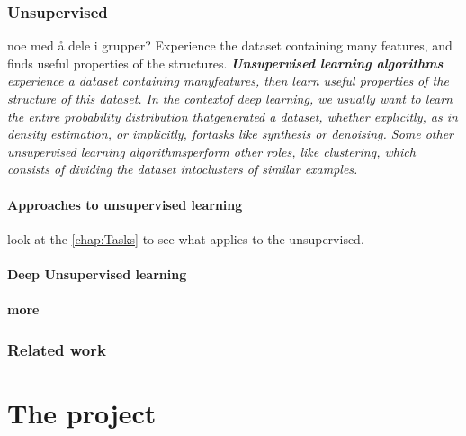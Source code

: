 \documentclass[a4paper,english]{ifimaster}
\begin{document}
\section{Unsupervised}
noe med å dele i grupper?
Experience the dataset containing many features, and finds useful properties of the structures. 
\textit{\textbf{Unsupervised learning algorithms} experience a dataset containing manyfeatures, then learn useful properties of the structure of this dataset. In the contextof deep learning, we usually want to learn the entire probability distribution thatgenerated a dataset, whether explicitly, as in density estimation, or implicitly, fortasks like synthesis or denoising. Some other unsupervised learning algorithmsperform other roles, like clustering, which consists of dividing the dataset intoclusters of similar examples.}
\cite{Goodfellow-et-al-2016}


\subsection{Approaches to unsupervised learning}
look at the \autoref{chap:Tasks} to see what applies to the unsupervised.

\subsection{Deep Unsupervised learning}
\subsection{more}
\section{Related work}


	      
		
		
		
		
		
		
		
		
		
		
		
		
		
		
		
		
		
		
		
		
		
		
		
		
		
\part{The project}
\end{document}
